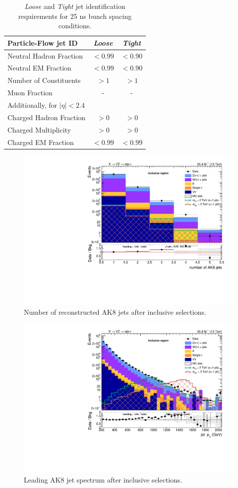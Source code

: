 \begin{table}[htb]
 \centering
 \caption{ \emph{Loose} and \emph{Tight} jet identification requirements for 25 ns bunch spacing conditions.\label{tab:JetId}}
 \begin{tabular}{l|cc}
Particle-Flow jet ID                       & \emph{Loose}   & \emph{Tight}   \\
\hline
 \hline
Neutral Hadron Fraction         & $< 0.99  $     & $< 0.90  $    \\
Neutral EM Fraction             & $< 0.99  $     & $< 0.90  $\\
Number of Constituents          & $> 1     $     & $> 1     $\\
Muon Fraction                   & \--            & \-- \\
\hline
\multicolumn{3}{l}{Additionally, for $|\eta| < 2.4$ } \\
\hline
Charged Hadron Fraction         & $> 0   $& $> 0   $\\
Charged Multiplicity            & $> 0   $& $> 0   $\\
Charged EM Fraction             & $< 0.99$& $< 0.99$\\
 \end{tabular}

\end{table}

\begin{figure}[!htb]
  \begin{center}
    \includegraphics[width=.495\textwidth]{plots/v9_thesis/XVZnnInc/nFatJets.pdf}
  \end{center}
  \caption{Number of reconstructed AK8 jets after inclusive selections.}
  \label{fig:n_AK8}
\end{figure}

\begin{figure}[!htb]
  \begin{center}
    \includegraphics[width=.495\textwidth]{plots/v9_thesis/XVZnnInc/FatJet1_pt.pdf}
  \end{center}
  \caption{Leading AK8 jet \pt spectrum after inclusive selections.}
  \label{fig:AK8jet_pt}
\end{figure}

